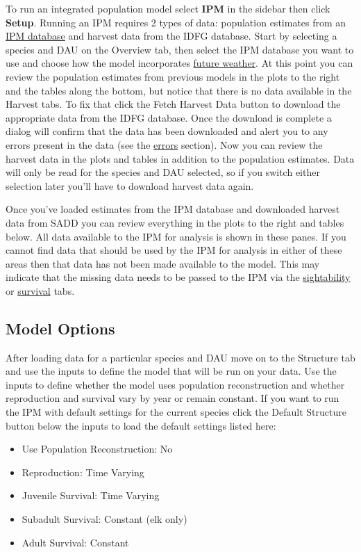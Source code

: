 \documentclass[
]{book}
\providecommand{\tightlist}{%
  \setlength{\itemsep}{0pt}\setlength{\parskip}{0pt}}
\begin{document}
To run an integrated population model select \textbf{IPM} in the sidebar then click \textbf{Setup}. Running an IPM requires 2 types of data: population estimates from an \protect\hyperlink{gl-ipm-db}{IPM database} and harvest data from the IDFG database. Start by selecting a species and DAU on the Overview tab, then select the IPM database you want to use and choose how the model incorporates \protect\hyperlink{gl-ipm-weather}{future weather}. At this point you can review the population estimates from previous models in the plots to the right and the tables along the bottom, but notice that there is no data available in the Harvest tabs. To fix that click the {Fetch Harvest Data} button to download the appropriate data from the IDFG database. Once the download is complete a dialog will confirm that the data has been downloaded and alert you to any errors present in the data (see the \protect\hyperlink{ipm-errors}{errors} section). Now you can review the harvest data in the plots and tables in addition to the population estimates. Data will only be read for the species and DAU selected, so if you switch either selection later you'll have to download harvest data again.

Once you've loaded estimates from the IPM database and downloaded harvest data from SADD you can review everything in the plots to the right and tables below. All data available to the IPM for analysis is shown in these panes. If you cannot find data that should be used by the IPM for analysis in either of these areas then that data has not been made available to the model. This may indicate that the missing data needs to be passed to the IPM via the \protect\hyperlink{sight}{sightability} or \protect\hyperlink{surv}{survival} tabs.

\hypertarget{ipm-options}{%
\subsection{Model Options}\label{ipm-options}}

After loading data for a particular species and DAU move on to the Structure tab and use the inputs to define the model that will be run on your data. Use the inputs to define whether the model uses population reconstruction and whether reproduction and survival vary by year or remain constant. If you want to run the IPM with default settings for the current species click the {Default Structure} button below the inputs to load the default settings listed here:

\begin{itemize}
\tightlist
\item
  Use Population Reconstruction: No
\item
  Reproduction: Time Varying
\item
  Juvenile Survival: Time Varying
\item
  Subadult Survival: Constant (elk only)
\item
  Adult Survival: Constant
\end{itemize}
\end{document}

